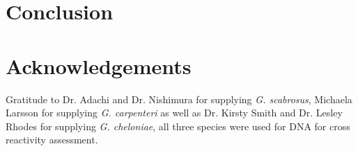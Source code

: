 \documentclass[12pt]{article}
\begin{document}
\section{Conclusion}
\section{Acknowledgements}
Gratitude to Dr. Adachi and Dr. Nishimura for supplying \emph{G. scabrosus}, Michaela Larsson for supplying \emph{G. carpenteri} as well as Dr. Kirsty Smith and Dr. Lesley Rhodes for supplying \emph{G. cheloniae}, all three species were used for DNA for cross reactivity assessment. 
\FloatBarrier
\newpage


\end{document}
